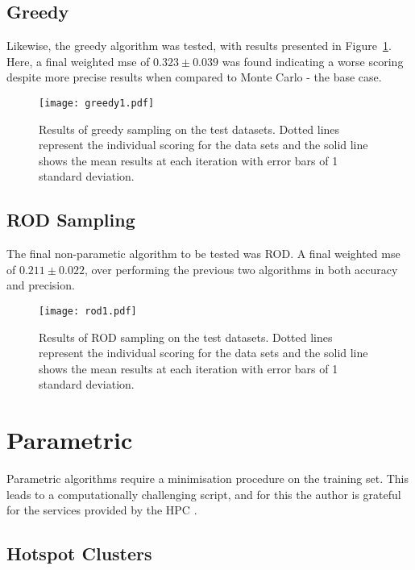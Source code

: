 \subsection{Greedy}
Likewise, the greedy algorithm was tested, with results presented in Figure~\ref{fig:GreedyTestSet}. Here, a final weighted mse of ${0.323\pm{}0.039}$ was found indicating a worse scoring despite more precise results when compared to Monte Carlo - the base case.
\begin{figure}[h]
    \begin{center}
        \texttt{[image: greedy1.pdf]}
        \caption[Greedy]{Results of greedy sampling on the test datasets. Dotted lines represent the individual scoring for the data sets and the solid line shows the mean results at each iteration with error bars of 1 standard deviation.}
        \label{fig:GreedyTestSet}
    \end{center}
\end{figure}

\subsection{ROD Sampling}
The final non-parametic algorithm to be tested was ROD. A final weighted mse of ${0.211\pm{}0.022}$, over performing the previous two algorithms in both accuracy and precision.

\begin{figure}[h]
    \begin{center}
        \texttt{[image: rod1.pdf]}
        \caption[ROD]{Results of ROD sampling on the test datasets. Dotted lines represent the individual scoring for the data sets and the solid line shows the mean results at each iteration with error bars of 1 standard deviation.}
        \label{fig:RODTestSet}
    \end{center}
\end{figure}

\section{Parametric}
Parametric algorithms require a minimisation procedure on the training set. This leads to a computationally challenging script, and for this the author is grateful for the services provided by the HPC \cite{HPC}.
\subsection{Hotspot Clusters}

